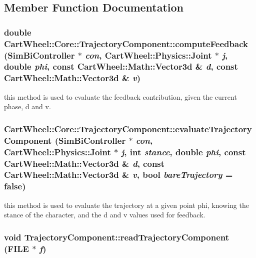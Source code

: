\subsection{Member Function Documentation}
\hypertarget{classCartWheel_1_1Core_1_1TrajectoryComponent_a7708f478d9116878361a321bfb907558}{
\subsubsection[{computeFeedback}]{\setlength{\rightskip}{0pt plus 5cm}double CartWheel::Core::TrajectoryComponent::computeFeedback ({\bf SimBiController} $\ast$ {\em con}, \/  {\bf CartWheel::Physics::Joint} $\ast$ {\em j}, \/  double {\em phi}, \/  const {\bf CartWheel::Math::Vector3d} \& {\em d}, \/  const {\bf CartWheel::Math::Vector3d} \& {\em v})}}
\label{classCartWheel_1_1Core_1_1TrajectoryComponent_a7708f478d9116878361a321bfb907558}
this method is used to evaluate the feedback contribution, given the current phase, d and v. \hypertarget{classCartWheel_1_1Core_1_1TrajectoryComponent_afefb087422e56e30397225216fb2444a}{
\subsubsection[{evaluateTrajectoryComponent}]{ CartWheel::Core::TrajectoryComponent::evaluateTrajectoryComponent ({\bf SimBiController} $\ast$ {\em con}, \/  {\bf CartWheel::Physics::Joint} $\ast$ {\em j}, \/  int {\em stance}, \/  double {\em phi}, \/  const {\bf CartWheel::Math::Vector3d} \& {\em d}, \/  const {\bf CartWheel::Math::Vector3d} \& {\em v}, \/  bool {\em bareTrajectory} = {\ttfamily false})}}
\label{classCartWheel_1_1Core_1_1TrajectoryComponent_afefb087422e56e30397225216fb2444a}
this method is used to evaluate the trajectory at a given point phi, knowing the stance of the character, and the d and v values used for feedback. \hypertarget{classCartWheel_1_1Core_1_1TrajectoryComponent_ae6df1efc43d8cb573b3dfa0493e491cf}{
\subsubsection[{readTrajectoryComponent}]{\setlength{\rightskip}{0pt plus 5cm}void TrajectoryComponent::readTrajectoryComponent (FILE $\ast$ {\em f})}}
